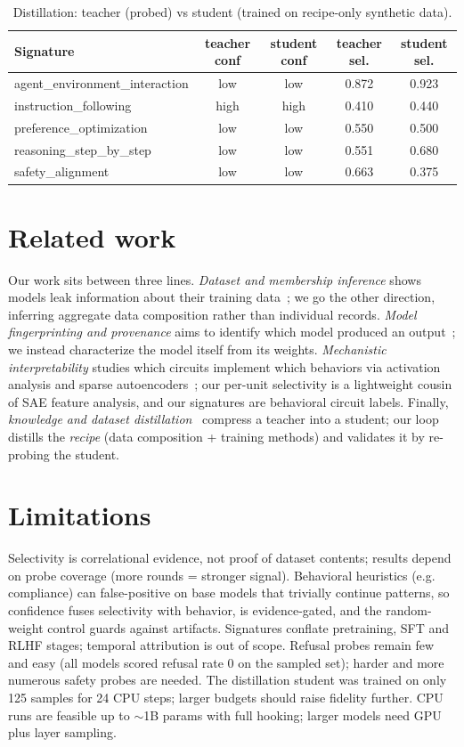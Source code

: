 \documentclass[11pt]{article}
\begin{document}
\begin{table}[h]
\centering
\caption{Distillation: teacher (probed) vs student (trained on recipe-only synthetic data).}
\label{tab:distill}
\begin{tabular}{lcccc}
\toprule
Signature & teacher conf & student conf & teacher sel. & student sel. \\
\midrule
agent\_environment\_interaction & low & low & 0.872 & 0.923 \\
instruction\_following & high & high & 0.410 & 0.440 \\
preference\_optimization & low & low & 0.550 & 0.500 \\
reasoning\_step\_by\_step & low & low & 0.551 & 0.680 \\
safety\_alignment & low & low & 0.663 & 0.375 \\
\bottomrule
\end{tabular}
\end{table}

\section{Related work}
Our work sits between three lines. \emph{Dataset and membership inference} shows models
leak information about their training data~\cite{carlini2021extracting,shokri2017membership};
we go the other direction, inferring aggregate data composition rather than individual
records. \emph{Model fingerprinting and provenance} aims to identify which model produced
an output~\cite{xu2024fingerprinting}; we instead characterize the model itself from its
weights. \emph{Mechanistic interpretability} studies which circuits implement which
behaviors via activation analysis and sparse autoencoders~\cite{cunningham2023sae};
our per-unit selectivity is a lightweight cousin of SAE feature analysis, and our
signatures are behavioral circuit labels. Finally, \emph{knowledge and dataset
distillation}~\cite{hinton2015distilling,wang2018dataset} compress a teacher into a
student; our loop distills the \emph{recipe} (data composition + training methods) and
validates it by re-probing the student.

\section{Limitations}
Selectivity is correlational evidence, not proof of dataset contents; results depend on
probe coverage (more rounds = stronger signal). Behavioral heuristics (e.g. compliance)
can false-positive on base models that trivially continue patterns, so confidence fuses
selectivity with behavior, is evidence-gated, and the random-weight control guards
against artifacts. Signatures conflate pretraining, SFT and RLHF stages; temporal
attribution is out of scope. Refusal probes remain few and easy (all models scored
refusal rate 0 on the sampled set); harder and more numerous safety probes are needed.
The distillation student was trained on only 125 samples for 24 CPU steps; larger budgets
should raise fidelity further. CPU runs are feasible up to $\sim$1B params with full
hooking; larger models need GPU plus layer sampling.
\end{document}
